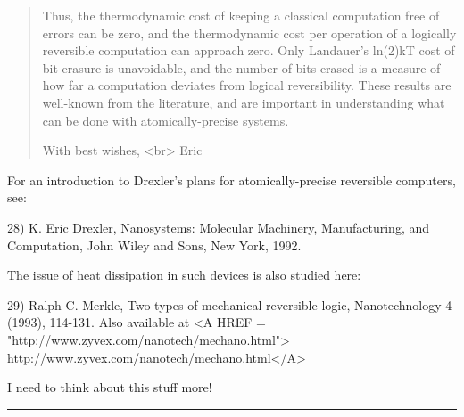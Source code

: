 \begin{quote}
Thus, the thermodynamic cost of keeping a classical computation free  
of errors can be zero, and the thermodynamic cost per operation of a  
logically reversible computation can approach zero. Only Landauer's 
ln(2)kT cost of bit erasure is unavoidable, and the number of bits  
erased is a measure of how far a computation deviates from logical  
reversibility. These results are well-known from the literature, and  
are important in understanding what can be done with atomically-precise 
systems.

With best wishes, <br>
Eric
\end{quote}

For an introduction to Drexler's plans for atomically-precise
reversible computers, see:

28) K. Eric Drexler, Nanosystems: Molecular Machinery, Manufacturing, 
and Computation, John Wiley and Sons, New York, 1992.

The issue of heat dissipation in such devices is also studied here:

29) Ralph C. Merkle, Two types of mechanical reversible logic,
Nanotechnology 4 (1993), 114-131.  Also available at 
<A HREF = "http://www.zyvex.com/nanotech/mechano.html">
http://www.zyvex.com/nanotech/mechano.html</A>

I need to think about this stuff more!




\par\noindent\rule{\textwidth}{0.4pt}
